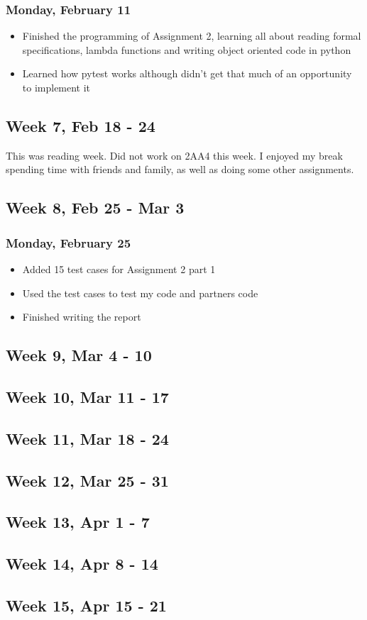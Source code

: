 \documentclass{article}
\begin{document}
\subsubsection{Monday, February 11}
\begin{itemize}
    \item Finished the programming of Assignment 2, learning all about reading formal specifications, lambda functions and writing object oriented code in python
    \item Learned how pytest works although didn't get that much of an opportunity to implement it
\end{itemize}

\subsection{Week 7, Feb 18 - 24}

This was reading week. Did not work on 2AA4 this week. I enjoyed my break spending time with friends and family, as well as doing some other assignments.

\subsection{Week 8, Feb 25 - Mar 3}

\subsubsection{Monday, February 25}
\begin{itemize}
    \item Added 15 test cases for Assignment 2 part 1
    \item Used the test cases to test my code and partners code
    \item Finished writing the report
\end{itemize}

\subsection{Week 9, Mar 4 - 10}

\subsection{Week 10, Mar 11 - 17}

\subsection{Week 11, Mar 18 - 24}

\subsection{Week 12, Mar 25 - 31}

\subsection{Week 13, Apr 1 - 7}

\subsection{Week 14, Apr 8 - 14}

\subsection{Week 15, Apr 15 - 21}
\end{document}
